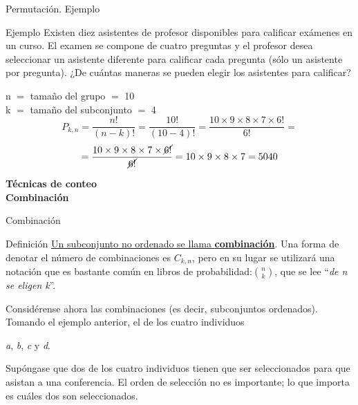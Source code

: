 \documentclass[11pt]{beamer}
\begin{document}
         \begin{frame}{Permutación. Ejemplo}
             \begin{block}{Ejemplo}
               Existen diez asistentes de profesor disponibles para calificar exámenes en un curso. El examen se compone de cuatro preguntas y el
profesor desea seleccionar un asistente diferente para calificar cada pregunta (sólo un asistente por pregunta). ¿De cuántas maneras se pueden elegir los asistentes para calificar?
             \end{block}
             \pause
             n $=$ tamaño del grupo $=$ 10\\
             k $=$ tamaño del subconjunto $=$ 4\\
             $$P_{k,n}=\dfrac{n!}{(n-k)!} = \dfrac{10!}{(10-4)!}= \dfrac{10 \times 9 \times 8 \times 7 \times 6!}{6!}=$$
             \pause
             $$= \dfrac{10 \times 9 \times 8 \times 7 \times \cancel{6!}}{\cancel{6!}}= 10 \times 9 \times 8 \times 7= 5040$$
         \end{frame}

         \begin{frame}{}
             \begin{center}
                 \textbf{\huge Técnicas de conteo\\  Combinación}
             \end{center}
         \end{frame}

         \begin{frame}{Combinación}
             \begin{block}{Definici\'on}
                 \underline{Un subconjunto no ordenado se llama \textbf{combinación}}. Una forma de denotar el número de combinaciones es $C_ {k,n}$, pero en su lugar se utilizará una notación que es bastante común en libros de probabilidad:$\binom{n}{k}$, que se lee “\textit{de n se eligen k}”.
             \end{block}
             \pause
             Considérense ahora las combinaciones (es decir, subconjuntos ordenados). Tomando el ejemplo anterior, el de los cuatro individuos\\ \begin{center}
                 \textit{a}, \textit{b}, \textit{c} y \textit{d}.
             \end{center}
         Supóngase que dos de los cuatro individuos tienen que ser seleccionados para que asistan a una conferencia. El orden de selección no es importante; lo que importa es cuáles dos son seleccionados.

         \end{frame}
\end{document}
